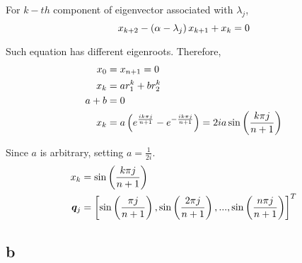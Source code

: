 \documentclass[letterpaper,10pt]{article}
\begin{document}
For $k-th$ component of eigenvector associated with $\lambda_j$, 
\begin{equation}
  x_{k+2}-\left(\alpha - \lambda_j\right)x_{k+1}+x_k=0\notag
\end{equation}

Such equation has different eigenroots. Therefore, 
\begin{align}
  x_0 &=x_{n+1} = 0\notag\\
  x_k &= ar_1^k + br_2^k\notag\\
  a+b &=0\notag\\
  x_k &= a\left(e^{\frac{ik\pi j}{n+1}}-e^{-\frac{ik\pi j}{n+1}}\right) = 2ia \sin \left(\frac{k\pi j}{n+1}\right)\notag
\end{align}

Since $a$ is arbitrary, setting $a = \frac{1}{2i}$. 
\begin{align}
  x_k &= \sin \left(\frac{k\pi j}{n+1}\right)\notag\\
  \bm{q}_j &= \left[\sin \left(\frac{\pi j}{n+1}\right),\sin \left(\frac{2\pi j}{n+1}\right),...,\sin \left(\frac{n\pi j}{n+1}\right)\right]^T\notag
\end{align}
\subsection*{b}
\end{document}
